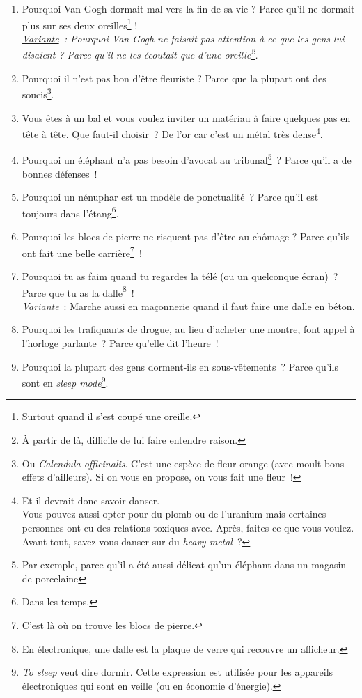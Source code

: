 \documentclass[10pt,a5paper,fullpage]{book}
\begin{document}
\begin{enumerate}
		\item Pourquoi Van Gogh dormait mal vers la fin de sa vie ? Parce qu'il ne dormait plus sur ses deux oreilles\footnote{Surtout quand il s'est coupé une oreille.} !
		\\\textit{\underline{Variante}~: Pourquoi Van Gogh ne faisait pas attention à ce que les gens lui disaient ? Parce qu'il ne les écoutait que d'une oreille\footnote{À partir de là, difficile de lui faire entendre raison.}.}
		\item Pourquoi il n'est pas bon d'être fleuriste ? Parce que la plupart ont des soucis\footnote{Ou \textit{Calendula officinalis}. C'est une espèce de fleur orange (avec moult bons effets d'ailleurs). Si on vous en propose, on vous fait une fleur~!}. 
		\item Vous êtes à un bal et vous voulez inviter un matériau à faire quelques pas en tête à tête. Que faut-il choisir~? De l'or car c'est un métal très dense\footnote{Et il devrait donc savoir danser. \\Vous pouvez aussi opter pour du plomb ou de l'uranium mais certaines personnes ont eu des relations toxiques avec. Après, faites ce que vous voulez. \\Avant tout, savez-vous danser sur du \textit{heavy metal}~?}.  
		\item Pourquoi un éléphant n'a pas besoin d'avocat au tribunal\footnote{Par exemple, parce qu'il a été aussi délicat qu'un éléphant dans un magasin de porcelaine}~? Parce qu'il a de bonnes défenses~!
		\item Pourquoi un nénuphar est un modèle de ponctualité~? Parce qu'il est toujours dans l'étang\footnote{Dans les temps.}.
		\item Pourquoi les blocs de pierre ne risquent pas d'être au chômage ? Parce qu'ils ont fait une belle carrière\footnote{C'est là où on trouve les blocs de pierre.}~!
		\item Pourquoi tu as faim quand tu regardes la télé (ou un quelconque écran)~? Parce que tu as la dalle\footnote{En électronique, une dalle est la plaque de verre qui recouvre un afficheur.}~!
		\\ \textit{Variante}~: Marche aussi en maçonnerie quand il faut faire une dalle en béton. 
		\item Pourquoi les trafiquants de drogue, au lieu d'acheter une montre, font appel à l'horloge parlante~? Parce qu'elle dit l'heure~!
		\item Pourquoi la plupart des gens dorment-ils en sous-vêtements~? Parce qu'ils sont en \textit{sleep mode}\footnote{\textit{To sleep} veut dire dormir. Cette expression est utilisée pour les appareils électroniques qui sont en veille (ou en économie d'énergie).}.

\end{enumerate}
\end{document}
